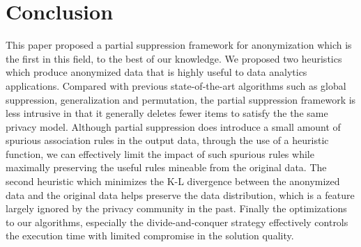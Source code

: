 \section{Conclusion}
\label{sec:conclude}
This paper proposed a partial suppression framework for
anonymization which is the first in this field, to the best of our knowledge. 
We proposed two heuristics which produce anonymized data 
that is highly useful to data analytics applications.
Compared with previous state-of-the-art algorithms such as
global suppression, generalization and permutation,
the partial suppression framework is less intrusive 
in that it generally deletes fewer items to satisfy the the same
privacy model.
Although partial suppression does introduce
a small amount of spurious association rules in the output data,
through the use of a heuristic function, we can
effectively limit the impact of such spurious rules while maximally preserving
the useful rules mineable from the original data. 
The second heuristic which minimizes the K-L divergence between the
anonymized data and the original data helps preserve the
data distribution, which is a feature largely ignored by the privacy
community in the past.
Finally the optimizations to our algorithms, especially the 
divide-and-conquer strategy effectively controls the execution time 
with limited compromise in the solution quality.


%
%
